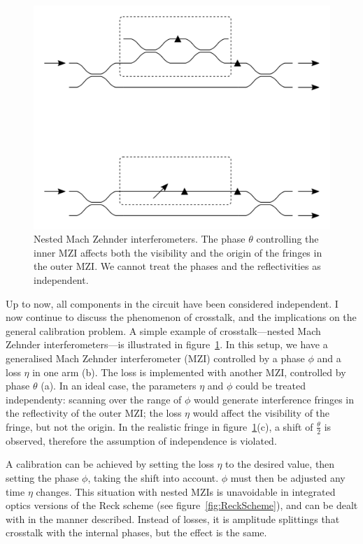 \begin{figure}[t]
  \centering
  \includegraphics{figures/crosstalk}
  \caption[Nested Mach Zehnder interferometers]
  {Nested Mach Zehnder interferometers. The phase \(\theta\) controlling the
  inner MZI affects both the visibility and the origin of the fringes in the
  outer MZI. We cannot treat the phases and the reflectivities as independent.}
  \label{fig:nestedMZI}
\end{figure}

Up to now, all components in the circuit have been considered independent. I now
continue to discuss the phenomenon of crosstalk, and the implications on the
general calibration problem. A simple example of crosstalk---nested Mach Zehnder
interferometers---is illustrated in figure~\ref{fig:nestedMZI}. In this setup,
we have a generalised Mach Zehnder interferometer (MZI) controlled by a phase
\(\phi\) and a loss \(\eta\) in one arm (b). The loss is implemented with
another MZI, controlled by phase \(\theta\) (a). In an ideal case, the
parameters \(\eta\) and \(\phi\) could be treated independenty: scanning over
the range of \(\phi\) would generate interference fringes in the reflectivity of
the outer MZI; the loss \(\eta\) would affect the visibility of the fringe, but
not the origin. In the realistic fringe in figure~\ref{fig:nestedMZI}(c), a
shift of \(\frac{\theta}{2}\) is observed, therefore the assumption of
independence is violated.

A calibration can be achieved by setting the loss \(\eta\) to the desired value,
then setting the phase \(\phi\), taking the shift into account. \(\phi\) must
then be adjusted any time \(\eta\) changes. This situation with nested MZIs is
unavoidable in integrated optics versions of the Reck scheme (see
figure~\ref{fig:ReckScheme}), and can be dealt with in the manner described.
Instead of losses, it is amplitude splittings that crosstalk with the internal
phases, but the effect is the same.

